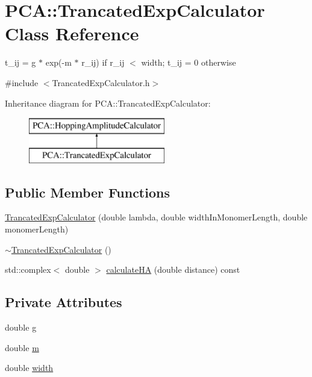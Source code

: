 \hypertarget{class_p_c_a_1_1_trancated_exp_calculator}{}\section{P\+CA\+:\+:Trancated\+Exp\+Calculator Class Reference}
\label{class_p_c_a_1_1_trancated_exp_calculator}


t\+\_\+ij = g $\ast$ exp(-\/m $\ast$ r\+\_\+ij) if r\+\_\+ij $<$ width; t\+\_\+ij = 0 otherwise  




{\ttfamily \#include $<$Trancated\+Exp\+Calculator.\+h$>$}

Inheritance diagram for P\+CA\+:\+:Trancated\+Exp\+Calculator\+:\begin{figure}[H]
\begin{center}
\leavevmode
\includegraphics[height=2.000000cm]{class_p_c_a_1_1_trancated_exp_calculator}
\end{center}
\end{figure}
\subsection*{Public Member Functions}
\begin{DoxyCompactItemize}
\item 
\hyperlink{class_p_c_a_1_1_trancated_exp_calculator_a634a2c2d9bc7f54bacf6531f6f8f2c3c}{Trancated\+Exp\+Calculator} (double lambda, double width\+In\+Monomer\+Length, double monomer\+Length)
\item 
\hyperlink{class_p_c_a_1_1_trancated_exp_calculator_a029cab04f65d1a4adebb1dbdf8fd4d3d}{$\sim$\+Trancated\+Exp\+Calculator} ()
\item 
std\+::complex$<$ double $>$ \hyperlink{class_p_c_a_1_1_trancated_exp_calculator_afe48461b23fd2b0d350f32bdac0c3d18}{calculate\+HA} (double distance) const
\end{DoxyCompactItemize}
\subsection*{Private Attributes}
\begin{DoxyCompactItemize}
\item 
double \hyperlink{class_p_c_a_1_1_trancated_exp_calculator_ade1e4dd2be1b5ec6f6e38cc1a251a719}{g}
\item 
double \hyperlink{class_p_c_a_1_1_trancated_exp_calculator_a3d26a4f32c4d4e1ff068cb58446f029d}{m}
\item 
double \hyperlink{class_p_c_a_1_1_trancated_exp_calculator_a18ac7bab1a2ddc18bc214a089d05e4ee}{width}
\end{DoxyCompactItemize}


